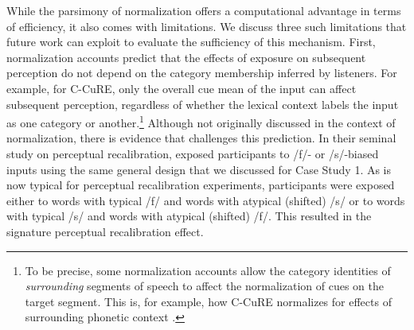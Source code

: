 \documentclass[
  11pt,
  man,floatsintext]{apa6}
\begin{document}
While the parsimony of normalization offers a computational advantage in terms of efficiency, it also comes with limitations. We discuss three such limitations that future work can exploit to evaluate the sufficiency of this mechanism. First, normalization accounts predict that the effects of exposure on subsequent perception do not depend on the category membership inferred by listeners. For example, for C-CuRE, only the overall cue mean of the input can affect subsequent perception, regardless of whether the lexical context labels the input as one category or another.\footnote{To be precise, some normalization accounts allow the category identities of \emph{surrounding} segments of speech to affect the normalization of cues on the target segment. This is, for example, how C-CuRE normalizes for effects of surrounding phonetic context \autocite{mcmurray-jongman2011}.} Although not originally discussed in the context of normalization, there is evidence that challenges this prediction. In their seminal study on perceptual recalibration, \textcite{norris2003} exposed participants to /f/- or /s/-biased inputs using the same general design that we discussed for Case Study 1. As is now typical for perceptual recalibration experiments, participants were exposed either to words with typical /f/ and words with atypical (shifted) /s/ or to words with typical /s/ and words with atypical (shifted) /f/. This resulted in the signature perceptual recalibration effect.
\end{document}
